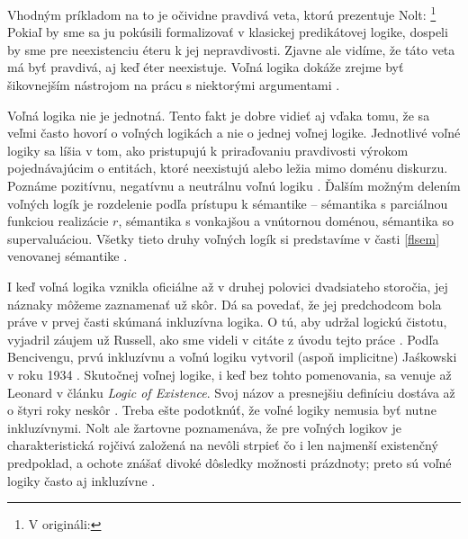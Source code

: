 \documentclass[12pt, letterpaper]{article}
\begin{document}
Vhodným príkladom na to je očividne pravdivá veta, ktorú prezentuje Nolt: \footnote{V origináli: } Pokiaľ by sme sa ju pokúsili formalizovať v klasickej predikátovej logike, dospeli by sme pre neexistenciu éteru k jej nepravdivosti. Zjavne ale vidíme, že táto veta má byť pravdivá, aj keď éter neexistuje. Voľná logika dokáže zrejme byť šikovnejším nástrojom na prácu s niektorými argumentami \parencites{sep-logic-free}.\par


Voľná logika nie je jednotná. Tento fakt je dobre vidieť aj vďaka tomu, že sa veľmi často hovorí o voľných logikách a nie o jednej voľnej logike. Jednotlivé voľné logiky sa líšia v tom, ako pristupujú k priraďovaniu pravdivosti výrokom pojednávajúcim o entitách, ktoré neexistujú alebo ležia mimo doménu diskurzu. Poznáme pozitívnu, negatívnu a neutrálnu voľnú logiku \parencites[2]{Morscher2001}{sep-logic-free}[290, 293]{Priest_2008}. 
Ďalším možným delením voľných logík je rozdelenie podľa prístupu k sémantike -- sémantika s parciálnou funkciou realizácie $r$, sémantika s vonkajšou a vnútornou doménou, sémantika so supervaluáciou.
Všetky tieto druhy voľných logík si predstavíme v časti \ref{flsem} venovanej sémantike \parencites[14]{Bencivenga1990}[11]{Morscher2001}.\par

I keď voľná logika vznikla oficiálne až v druhej polovici dvadsiateho storočia, jej náznaky môžeme zaznamenať už skôr. Dá sa povedať, že jej predchodcom bola práve v prvej časti skúmaná inkluzívna logika. O tú, aby udržal logickú čistotu, vyjadril záujem už Russell, ako sme videli v citáte z úvodu tejto práce \parencites[152--155]{Bencivenga2002}[1]{Morscher2001}[]{sep-logic-free}. Podľa Bencivengu, prvú inkluzívnu a voľnú logiku vytvoril (aspoň implicitne) Jaśkowski v roku 1934 \parencites[]{bencivenga_jaskowski}[27]{Morscher2001}. Skutočnej voľnej logike, i keď bez tohto pomenovania, sa venuje až Leonard v článku \textit{Logic of Existence}. Svoj názov a presnejšiu definíciu dostáva až o štyri roky neskôr \parencites[]{sep-logic-free}[304--305]{Priest_2008}. Treba ešte podotknúť, že voľné logiky nemusia byť nutne inkluzívnymi. Nolt ale žartovne poznamenáva, že pre voľných logikov je charakteristická rojčivá  založená na nevôli strpieť čo i len najmenší existenčný predpoklad, a ochote znášať divoké dôsledky možnosti prázdnoty;  preto sú voľné logiky často aj inkluzívne \parencites[1026]{Nolt2007}.
\end{document}
